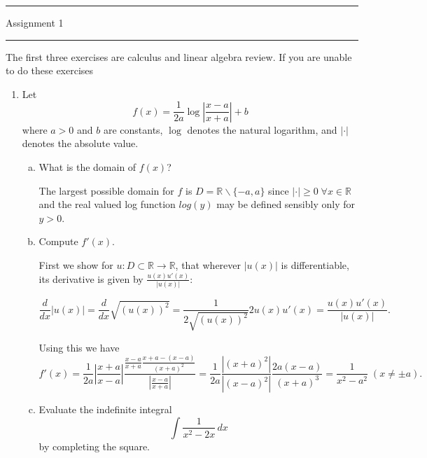 \documentclass[letterpaper,12pt,fleqn]{article}
\begin{document}
\pagestyle{empty}

\hrule \vspace{0.5em}
 \hfill Assignment 1 \newline \hrule

\vspace{1em}

The first three exercises are calculus and linear algebra review. If you are unable to do these exercises%

\begin{enumerate}
\item Let
\begin{equation*}
f(x) = \frac{1}{2a} \log \left| \frac{x - a}{x + a} \right| + b
\end{equation*}
where $a > 0$ and $b$ are constants, $\log$ denotes the natural logarithm, and $| \cdot |$ denotes the absolute value.

\begin{enumerate}[a)]
\item What is the domain of $f(x)$?

The largest possible domain for $f$ is $D = \mathbb{R} \backslash \{-a,a\}$ since $| \cdot | \geq 0 \; \forall x \in \mathbb{R}$ and the real valued log function $log(y)$ may be defined sensibly only for $y > 0$.

\item Compute $f'(x)$.

First we show for $u : D \subset \mathbb{R} \longrightarrow \mathbb{R}$, that wherever $|u(x)|$ is differentiable, its derivative is given by $\frac{u(x)u'(x)}{|u(x)|}$:

$$ \frac{d}{dx} |u(x)| = \frac{d}{dx} \sqrt{(u(x))^2} = \frac{1}{2\sqrt{(u(x))^2}}2u(x)u'(x) = \frac{u(x)u'(x)}{|u(x)|}.$$

Using this we have
$$f'(x) = \frac{1}{2a}\left|\frac{x+a}{x-a}\right|\frac{\frac{x-a}{x+a}\frac{x+a-(x-a)}{(x+a)^2}}{\left|\frac{x-a}{x+a}\right|} = \frac{1}{2a}\frac{|(x+a)^2|}{|(x-a)^2|}\frac{2a(x-a)}{(x+a)^3} = \frac{1}{x^2-a^2} \; (x \neq \pm a).$$

\item Evaluate the indefinite integral
\begin{equation*}
\int \frac{1}{x^{2} - 2x} \, dx
\end{equation*}
by completing the square.


\end{enumerate}
\end{enumerate}
\end{document}
